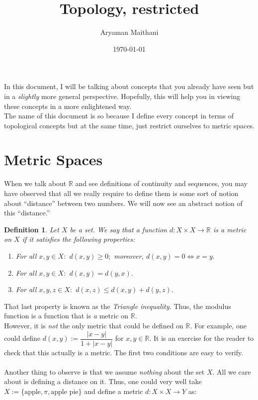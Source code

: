 \documentclass{article}
\title{Topology, restricted}
\author{Aryaman Maithani}
\date{\today}
\newtheorem{defn}{Definition}
\newcounter{exercise}
\begin{document}
\maketitle
\hrulefill

In this document, I will be talking about concepts that you already have seen but in a \emph{slightly} more general perspective. Hopefully, this will help you in viewing these concepts in a more enlightened way.\\
The name of this document is so because I define every concept in terms of topological concepts but at the same time, just restrict ourselves to metric spaces.\\
\section{Metric Spaces}
	When we talk about $\mathbb{R}$ and see definitions of continuity and sequences, you may have observed that all we really require to define them is some sort of notion about ``distance'' between two numbers. We will now see an abstract notion of this ``distance.''
	\begin{defn}
		Let $X$ be a set. We say that a function $d:X\times X \to \mathbb{R}$ is a \emph{metric} on $X$ if it satisfies the following properties:
		\begin{enumerate} 
			\item For all $x, y \in X:$ $d(x, y) \ge 0;$ moreover, $d(x, y) = 0 \iff x = y.$
			\item For all $x, y \in X:$ $d(x, y) = d(y, x).$
			\item For all $x, y, z \in X:$ $d(x, z) \le d(x, y) + d(y, z).$
		\end{enumerate}
	\end{defn}
	That last property is known as the \emph{Triangle inequality.}
	Thus, the modulus function is a function that is \emph{a} metric on $\mathbb{R}.$\\
	However, it is \emph{not} the only metric that could be defined on $\mathbb{R}.$ For example, one could define $d(x, y) := \dfrac{|x-y|}{1 + |x-y|}$ for $x, y \in \mathbb{R}.$ It is an exercise for the reader to check that this actually is a metric. The first two conditions are easy to verify.\\~\\
	Another thing to observe is that we assume \emph{nothing} about the set $X.$ All we care about is defining a distance on it. Thus, one could very well take $X := \{\text{apple}, \pi, \text{apple pie}\}$ and define a metric $d:X \times X \to Y$ as:
\end{document}
